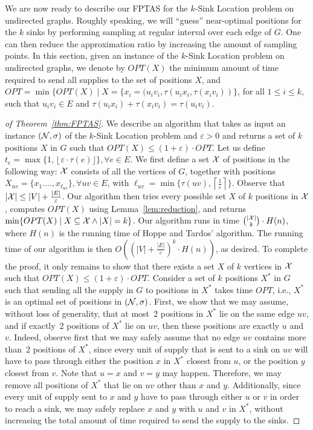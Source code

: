 \documentclass[a4paper,10pt]{llncs}
\begin{document}
We are now ready to describe our FPTAS for the $k$-{\sc Sink Location} problem on undirected graphs. Roughly speaking, we will ``guess'' near-optimal positions for the $k$ sinks by performing sampling at regular interval over each edge of $G$. One can then reduce the approximation ratio by increasing the amount of sampling points. In this section, given an instance of the $k$-{\sc Sink Location} problem on undirected graphs, we denote by $OPT(X)$ the minimum amount of time required to send all supplies to the set of positions $X$, and $OPT=\min\{OPT(X)\mid X=\{x_i=(u_iv_i,\tau(u_ix_i,\tau(x_iv_i))\}$, for all $1\leq i\leq k$, such that  $u_iv_i\in E$ and $\tau(u_ix_i)+\tau(x_iv_i)=\tau(u_iv_i)$.

\begin{proof}[of Theorem~\ref{thm:FPTAS}]
We describe an algorithm that takes as input an instance $({\cal N},\sigma)$ of the $k$-{\sc Sink Location} problem and $\varepsilon>0$ and returns a set of $k$ positions $X$ in $G$ such that $OPT(X) \leq (1+\varepsilon)\cdot OPT$. Let us define $t_e=\max\{1, \left\lfloor\varepsilon\cdot \tau(e)\rfloor\right.\}, \forall e\in E$. 
We first define a set ${\cal X}$ of positions in the following way: ${\cal X}$ consists of all the vertices of $G$, together with positions $X_{uv}=\{x_1.\ldots,x_{\ell_{uv}}\}, \forall uv\in E$, with  $\ell_{uv}=\min\{\tau(uv), \left\lceil \frac{1}{\varepsilon} \right\rceil\}$. Observe that $|{\cal X}| \leq |V| + \frac{|E|}{\varepsilon}$. Our algorithm then tries every possible set $X$ of $k$ positions in ${\cal X}$, computes $OPT(X)$ using Lemma~\ref{lem:reduction}, and returns $\min\{OPT(X) \mid X\subseteq {\cal X} \wedge |X|=k\}$. Our algorithm runs in time ${|{\cal X}| \choose k} \cdot H(n)$, where $H(n)$ is the running time of Hoppe and Tardos' algorithm. The running time of our algorithm is then $O((|V|+\frac{|E|}{\varepsilon})^k \cdot H(n))$, as desired.
To complete the proof, it only remains to show that there exists a set $X$ of $k$ vertices in ${\cal X}$ such that $OPT(X)\leq(1+\varepsilon)\cdot OPT$.
Consider a set of $k$ positions $X^*$ in $G$ such that sending all the supply in $G$ to positions in $X^*$ takes time $OPT$, i.e., $X^*$ is an optimal set of positions in $({\cal N},\sigma)$. First, we show that we may assume, without loss of generality, that at most~2 positions in $X^*$ lie on the same edge $uv$, and if exactly~2 positions of $X^*$ lie on $uv$, then these positions are exactly $u$ and $v$. Indeed, observe first that we may safely assume that no edge $uv$ contains more than~2 positions of $X^*$, since every unit of supply that is sent to a sink on $uv$ will have to pass through either the position $x$ in $X^*$ closest from $u$, or the position $y$ closest from $v$. Note that $u=x$ and $v=y$ may happen. Therefore, we may remove all positions of $X^*$ that lie on $uv$ other than $x$ and $y$. Additionally, since every unit of supply sent to $x$ and $y$ have to pass through either $u$ or $v$ in order to reach a sink, we may safely replace $x$ and $y$ with $u$ and $v$ in $X^*$, without increasing the total amount of time required to send the supply to the sinks.

\end{proof}
\end{document}
